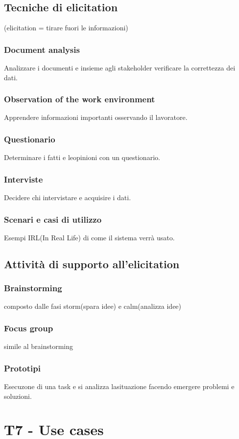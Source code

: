 \documentclass{article}
\begin{document}
\subsection{Tecniche di elicitation}
(elicitation = tirare fuori le informazioni)
\subsubsection{Document analysis}

Analizzare i documenti e insieme agli stakeholder verificare la correttezza dei dati.

\subsubsection{Observation of the work environment}
Apprendere informazioni importanti osservando il lavoratore.
\subsubsection{Questionario}
Determinare i fatti e leopinioni con un questionario.
\subsubsection{Interviste}
Decidere chi intervistare e acquisire i dati.
\subsubsection{Scenari e casi di utilizzo}
Esempi IRL(In Real Life) di come il sistema verrà usato.

\subsection{Attività di supporto all'elicitation}
\subsubsection{Brainstorming}
composto dalle fasi storm(spara idee) e calm(analizza idee)
\subsubsection{Focus group}
simile al brainstorming
\subsubsection{Prototipi}
Esecuzone di una task e si analizza lasituazione facendo emergere problemi
e soluzioni.

\section{T7 - Use cases}
\end{document}
